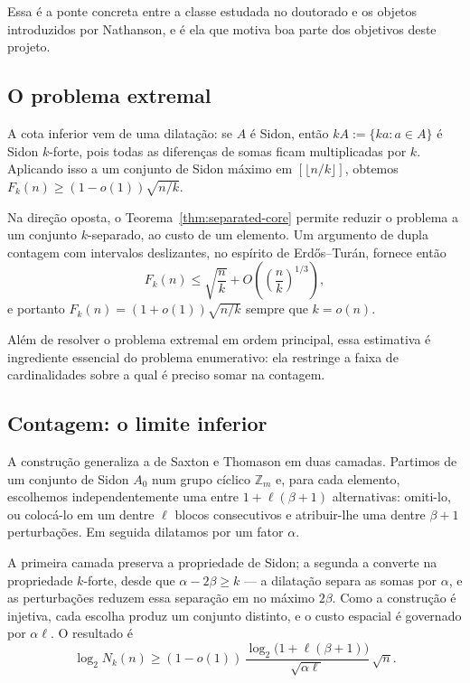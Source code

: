 \documentclass[11pt,a4paper]{article}
\theoremstyle{definition}
\theoremstyle{remark}
\begin{document}
Essa é a ponte concreta entre a classe estudada no doutorado e os
objetos introduzidos por Nathanson, e é ela que motiva boa parte dos
objetivos deste projeto.

\subsection{O problema extremal}
\label{sec:extremal}

A cota inferior vem de uma dilatação: se \(A\) é Sidon, então
\(kA:=\{ka:a\in A\}\) é Sidon \(k\)-forte, pois todas as diferenças de
somas ficam multiplicadas por \(k\). Aplicando isso a um conjunto de
Sidon máximo em \([\lfloor n/k\rfloor]\), obtemos
\(F_k(n)\geq(1-o(1))\sqrt{n/k}\).

Na direção oposta, o Teorema~\ref{thm:separated-core} permite reduzir o
problema a um conjunto \(k\)-separado, ao custo de um elemento. Um
argumento de dupla contagem com intervalos deslizantes, no espírito de
Erdős--Turán, fornece então
\[
  F_k(n)
  \leq
  \sqrt{\frac nk}
  +
  O\!\left(\left(\frac nk\right)^{1/3}\right),
\]
e portanto \(F_k(n)=(1+o(1))\sqrt{n/k}\) sempre que \(k=o(n)\).

Além de resolver o problema extremal em ordem principal, essa estimativa
é ingrediente essencial do problema enumerativo: ela restringe a faixa
de cardinalidades sobre a qual é preciso somar na contagem.

\subsection{Contagem: o limite inferior}
\label{sec:lower}

A construção generaliza a de Saxton e Thomason em duas camadas.
Partimos de um conjunto de Sidon \(A_0\) num grupo cíclico
\(\mathbb Z_m\) e, para cada elemento, escolhemos independentemente uma
entre \(1+\ell(\beta+1)\) alternativas: omiti-lo, ou colocá-lo em um
dentre \(\ell\) blocos consecutivos e atribuir-lhe uma dentre
\(\beta+1\) perturbações. Em seguida dilatamos por um fator \(\alpha\).

A primeira camada preserva a propriedade de Sidon; a segunda a converte
na propriedade \(k\)-forte, desde que \(\alpha-2\beta\geq k\) --- a
dilatação separa as somas por \(\alpha\), e as perturbações reduzem essa
separação em no máximo \(2\beta\). Como a construção é injetiva, cada
escolha produz um conjunto distinto, e o custo espacial é governado por
\(\alpha\ell\). O resultado é
\[
  \log_2 N_k(n)
  \geq
  (1-o(1))\,
  \frac{\log_2\bigl(1+\ell(\beta+1)\bigr)}{\sqrt{\alpha\ell}}\,\sqrt n .
\]
\end{document}
